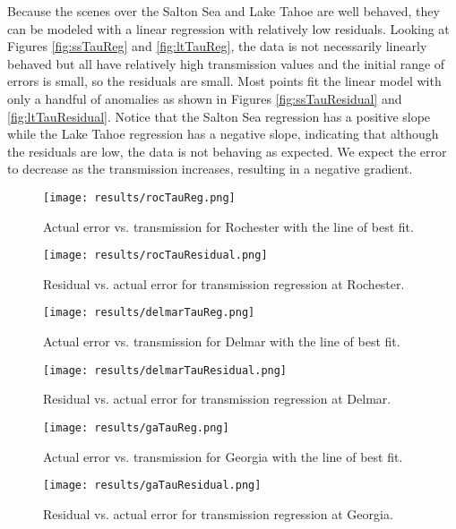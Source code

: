\documentclass{book}
\begin{document}
Because the scenes over the Salton Sea and Lake Tahoe are well behaved, they can be modeled with a linear regression with relatively low residuals.  Looking at Figures \ref{fig:ssTauReg} and \ref{fig:ltTauReg}, the data is not necessarily linearly behaved but all have relatively high transmission values and the initial range of errors is small, so the residuals are small.  Most points fit the linear model with only a handful of anomalies as shown in Figures \ref{fig:ssTauResidual} and \ref{fig:ltTauResidual}.  Notice that the Salton Sea regression has a positive slope while the Lake Tahoe regression has a negative slope, indicating that although the residuals are low, the data is not behaving as expected.  We expect the error to decrease as the transmission increases, resulting in a negative gradient.

\begin{figure}[H]
\begin{minipage}[b]{0.47\textwidth}
\centering
\texttt{[image: results/rocTauReg.png]}
\caption{Actual error vs. transmission for Rochester with the line of best fit.}
\label{fig:rocTauReg}
\end{minipage}
\begin{minipage}[b]{0.47\textwidth}
\centering
\texttt{[image: results/rocTauResidual.png]}
\caption{Residual vs. actual error for transmission regression at Rochester.}
\label{fig:rocTauResidual}
\end{minipage}
\end{figure}

\begin{figure}[H]
\begin{minipage}[b]{0.47\textwidth}
\centering
\texttt{[image: results/delmarTauReg.png]}
\caption{Actual error vs. transmission for Delmar with the line of best fit.}
\label{fig:delmarTauReg}
\end{minipage}
\begin{minipage}[b]{0.47\textwidth}
\centering
\texttt{[image: results/delmarTauResidual.png]}
\caption{Residual vs. actual error for transmission regression at Delmar.}
\label{fig:delmarTauResidual}
\end{minipage}
\end{figure}

\begin{figure}[H]
\begin{minipage}[b]{0.47\textwidth}
\centering
\texttt{[image: results/gaTauReg.png]}
\caption{Actual error vs. transmission for Georgia with the line of best fit.}
\label{fig:gaTauReg}
\end{minipage}
\begin{minipage}[b]{0.47\textwidth}
\centering
\texttt{[image: results/gaTauResidual.png]}
\caption{Residual vs. actual error for transmission regression at Georgia.}
\label{fig:gaTauResidual}
\end{minipage}
\end{figure}
\end{document}

